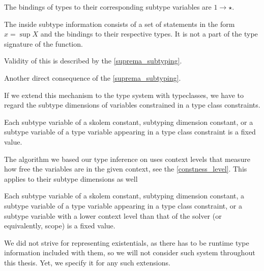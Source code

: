 \begin{remark}
    The bindings of types to their corresponding subtype variables are $1 \to \star$.
\end{remark}

\begin{defn}
    The inside subtype information consists of a set of statements in the form $x = \sup X$ and the bindings to their respective types. It is not a part of the type signature of the function.

    Validity of this is described by the \cref{suprema_subtyping}.
\end{defn}

\begin{remark}
    Another direct consequence of the \cref{suprema_subtyping}.
\end{remark}

If we extend this mechanism to the type system with typeclasses, we have to regard the subtype dimensions of variables constrained in a type class constraints.

\begin{defn}
    Each subtype variable of a skolem constant, subtyping dimension constant, or a subtype variable of a type variable appearing in a type class constraint is a fixed value.
\end{defn}


The algorithm we based our type inference on uses context levels that measure how free the variables are in the given context, see the \cref{constness_level}. This applies to their subtype dimensions as well

\begin{defn}
    Each subtype variable of a skolem constant, subtyping dimension constant, a subtype variable of a type variable appearing in a type class constraint, or a subtype variable with a lower context level than that of the solver (or equivalently, scope) is a fixed value.
\end{defn}

We did not strive for representing existentials, as there has to be runtime type information included with them, so we will not consider such system throughout this thesis. Yet, we specify it for any such extensions.


